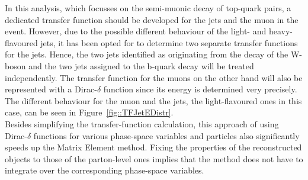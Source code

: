 In this analysis, which focusses on the semi-muonic decay of top-quark pairs, a dedicated transfer function should be developed for the jets and the muon in the event.
However, due to the possible different behaviour of the light- and heavy-flavoured jets, it has been opted for to determine two separate transfer functions for the jets.
Hence, the two jets identified as originating from the decay of the W-boson and the two jets assigned to the b-quark decay will be treated independently. 
The transfer function for the muons on the other hand will also be represented with a Dirac-$\delta$ function since its energy is determined very precisely. The different behaviour for the muon and the jets, the light-flavoured ones in this case, can be seen in Figure~\ref{fig::TFJetEDistr}.
\\
Besides simplifying the transfer-function calculation, this approach of using Dirac-$\delta$ functions for various phase-space variables and particles also significantly speeds up the Matrix Element method.
Fixing the properties of the reconstructed objects to those of the parton-level ones implies that the method does not have to integrate over the corresponding phase-space variables.
\\
